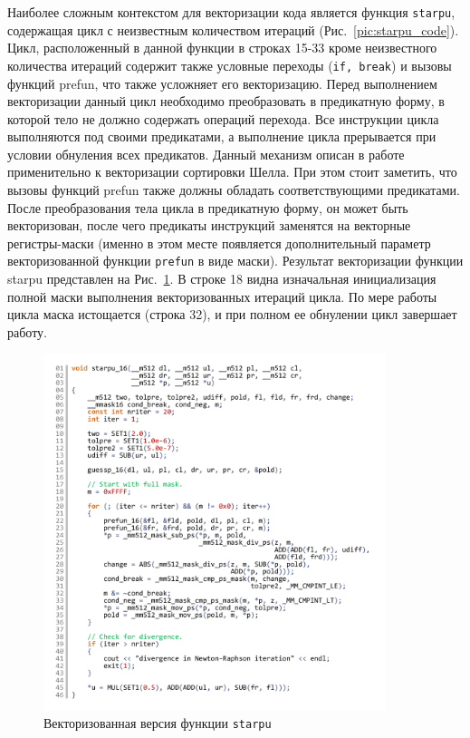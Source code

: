 \documentclass[utf8]{psta}
\begin{document}
Наиболее сложным контекстом для векторизации кода является функция \texttt{starpu}, содержащая цикл с неизвестным количеством итераций (Рис.~\ref{pic:starpu_code}).
Цикл, расположенный в данной функции в строках 15-33 кроме неизвестного количества итераций содержит также условные переходы (\texttt{if, break}) и вызовы функций prefun, что также усложняет его векторизацию.
Перед выполнением векторизации данный цикл необходимо преобразовать в предикатную форму, в которой тело не должно содержать операций перехода.
Все инструкции цикла выполняются под своими предикатами, а выполнение цикла прерывается при условии обнуления всех предикатов.
Данный механизм описан в работе \cite{RybTelShabLoopsVect} применительно к векторизации сортировки Шелла.
При этом стоит заметить, что вызовы функций prefun также должны обладать соответствующими предикатами.
После преобразования тела цикла в предикатную форму, он может быть векторизован, после чего предикаты инструкций заменятся на векторные регистры-маски (именно в этом месте появляется дополнительный параметр векторизованной функции \texttt{prefun} в виде маски).
Результат векторизации функции starpu представлен на Рис.~\ref{pic:starpu_16_code}.
В строке 18 видна изначальная инициализация полной маски выполнения векторизованных итераций цикла. По мере работы цикла маска истощается (строка 32), и при полном ее обнулении цикл завершает работу.

\begin{figure}
\includegraphics[width=10cm]{pics/pic_starpu_16_code}
\caption{Векторизованная версия функции \texttt{starpu}}
\label{pic:starpu_16_code}
\end{figure}
\end{document}
